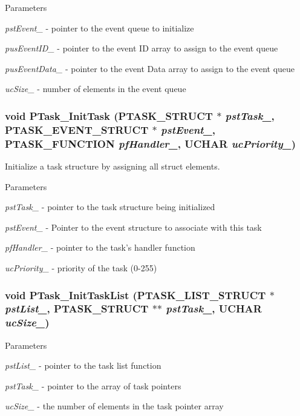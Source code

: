 \begin{DoxyParams}{Parameters}
\item[{\em pstEvent\_\-}]-\/ pointer to the event queue to initialize \item[{\em pusEventID\_\-}]-\/ pointer to the event ID array to assign to the event queue \item[{\em pusEventData\_\-}]-\/ pointer to the event Data array to assign to the event queue \item[{\em ucSize\_\-}]-\/ number of elements in the event queue \end{DoxyParams}
\subsubsection[{PTask\_\-InitTask}]{\setlength{\rightskip}{0pt plus 5cm}void PTask\_\-InitTask ({\bf PTASK\_\-STRUCT} $\ast$ {\em pstTask\_\-}, \/  {\bf PTASK\_\-EVENT\_\-STRUCT} $\ast$ {\em pstEvent\_\-}, \/  {\bf PTASK\_\-FUNCTION} {\em pfHandler\_\-}, \/  UCHAR {\em ucPriority\_\-})}\label{ptask_8h_a22bb2f3afdfabbb583338bd9488aefa4}
Initialize a task structure by assigning all struct elements.


\begin{DoxyParams}{Parameters}
\item[{\em pstTask\_\-}]-\/ pointer to the task structure being initialized \item[{\em pstEvent\_\-}]-\/ Pointer to the event structure to associate with this task \item[{\em pfHandler\_\-}]-\/ pointer to the task's handler function \item[{\em ucPriority\_\-}]-\/ priority of the task (0-\/255) \end{DoxyParams}
\subsubsection[{PTask\_\-InitTaskList}]{\setlength{\rightskip}{0pt plus 5cm}void PTask\_\-InitTaskList ({\bf PTASK\_\-LIST\_\-STRUCT} $\ast$ {\em pstList\_\-}, \/  {\bf PTASK\_\-STRUCT} $\ast$$\ast$ {\em pstTask\_\-}, \/  UCHAR {\em ucSize\_\-})}\label{ptask_8h_a0db5465e03e892a4a468227fa80484e7}

\begin{DoxyParams}{Parameters}
\item[{\em pstList\_\-}]-\/ pointer to the task list function \item[{\em pstTask\_\-}]-\/ pointer to the array of task pointers \item[{\em ucSize\_\-}]-\/ the number of elements in the task pointer array \end{DoxyParams}
